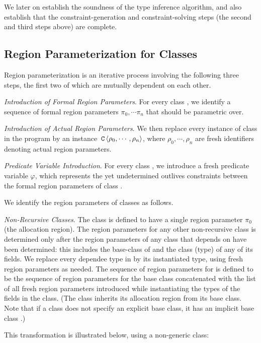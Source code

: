 We later on establish the soundness of the type inference algorithm, and also establish
that the constraint-generation and constraint-solving steps (the second and third steps
above) are complete.

\subsection{Region Parameterization for Classes}
\label{sec:fb-templatization}

Region parameterization is an iterative process involving the following three steps,
the first two of which are mutually dependent on each other.

\emph{Introduction of Formal Region Parameters}.
For every class , we identify a sequence of formal region parameters
$\pi_0, \cdots \pi_n$ that  should be parametric over.

\emph{Introduction of Actual Region Parameters}.
We then replace every instance of class  in the program by an instance
$\,{\tt C}\,\langle \rho_0, \cdots, \rho_n \rangle$, where $\rho_0, \cdots, \rho_n$
are fresh identifiers denoting actual region parameters.

\emph{Predicate Variable Introduction}. For every class , we introduce
a fresh predicate variable $\varphi$, which represents the yet undetermined
outlives constraints between the formal region parameters of class .

We identify the region parameters of classes as follows.

\emph{Non-Recursive Classes}.
The class  is defined to have a single region parameter $\pi_0$ (the allocation region).
The region parameters for any other non-recursive class  is determined
only after the region parameters of any class that  depends on have been
determined: this includes the base-class  of  and the class (type)
of any of its fields.
We replace every dependee type  in  by its instantiated type,
using fresh region parameters as needed.
The sequence of region parameters for  is defined to be
the sequence of region parameters for the base class  concatenated
with the list of all  fresh region parameters introduced while instantiating the types
of the fields in the class.
(The class inherits its allocation region from its base class. Note that if
a class does not specify an explicit base class, it has an implicit base class
.)

This transformation is illustrated below, using a non-generic  class:

